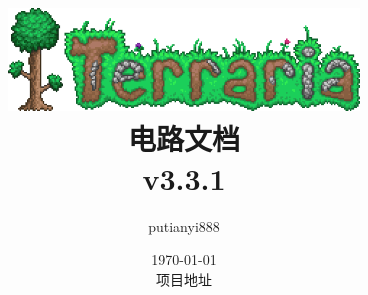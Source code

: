 
\usepackage[labelformat=simple,listofformat=subsimple]{subfig}
\usepackage{longtable}
\usepackage[boxed]{algorithm2e}
\usepackage{makecell}
\usepackage{rotating}
\usepackage{wrapfig}
\usepackage{tikz}
\usepackage{forest}
\usepackage{pgfplots}
\usepackage{multirow}
\usepackage{verbatim}
\usepackage{listings}

\pgfplotsset{compat=1.6}


\AtBeginDocument{
	\setcounter{tocdepth}{0}
}

\setcounter{totalnumber}{100}

\newcommand{\DMC}{死人的宝箱}
\newcommand{\FM}{造雾机}
\newcommand{\Grate}{格栅}
\newcommand{\PL}{等离子灯}
\newcommand{\Volcano}{火山}
\newcommand{\GC}{高尔夫球洞}
\newcommand{\Lesion}{损伤}
\newcommand{\Bamboo}{竹}





\title{
	\includegraphics[width=0.7\textwidth]{figure/terraria.png}\\
	电路文档\\
	v3.3.1
}

\author{putianyi888}
\date{
	\today\\
	项目地址 
}



\maketitle
\tableofcontents

\mainmatter
\hypersetup{pageanchor=true}






%

%

\appendix







